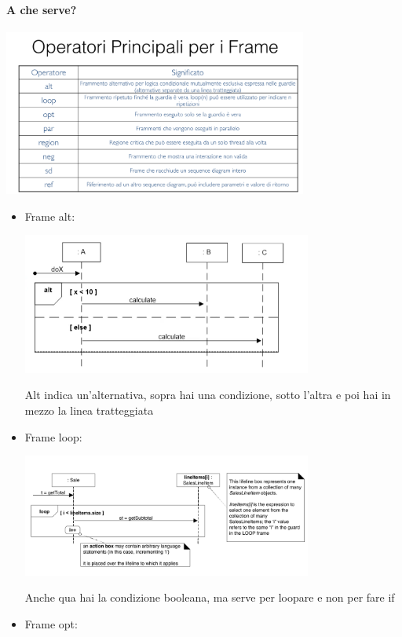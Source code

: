 \documentclass[12pt, a4paper, openany, twoside]{book}
\begin{document}
\begin{itemize}
	\paragraph{A che serve?} \begin{center}
	\includegraphics[width=0.75\textwidth]{13}
	\end{center}
	\begin{itemize}
		\item Frame alt: 
		\begin{center}
		\includegraphics[width=0.75\textwidth]{14}
		\end{center}
		Alt indica un'alternativa, sopra hai una condizione, sotto l'altra e poi
		hai in mezzo la linea tratteggiata
		\item Frame loop:
		\begin{center}
		\includegraphics[width=0.75\textwidth]{15}
		\end{center}
		Anche qua hai la condizione booleana, ma serve per loopare e non per fare
		if
		\item Frame opt:
		\begin{center}

\end{center}
\end{itemize}
\end{itemize}
\end{document}
